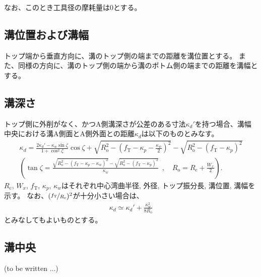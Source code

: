なお、このとき工具径の摩耗量は0とする。


\subsection{溝位置および溝幅}
トップ端から垂直方向に、溝のトップ側の端までの距離を溝位置とする。
また、同様の方向に、溝のトップ側の端から溝のボトム側の端までの距離を溝幅とする。


\subsection{溝深さ}
トップ側に外削がなく、かつA側溝深さが公差のある寸法$\kappa_d'$を持つ場合、溝幅中央における溝A側面とA側外面との距離$\kappa_d$は以下のものとみなす。
\begin{gather*}
  \kappa_d
  = \frac{2\kappa_d'-\kappa_w\sin\zeta}{1+\cos^2\zeta}\cos\zeta
    +\sqrt{R_\mathrm o^2-\left(f_\mathrm T-\kappa_p-\frac{\kappa_w}2\right)^{\!2}}
    -\sqrt{R_\mathrm o^2-\left(f_\mathrm T-\kappa_p\right)^2}\\[3pt]
  \left(
  \tan\zeta
  = \frac{\sqrt{R_\mathrm o^2-\left(f_\mathrm T-\kappa_p-\kappa_w\right)^2}
          -\sqrt{R_\mathrm o^2-\left(f_\mathrm T-\kappa_p\right)^2}}
         {\kappa_w}
    ~~, \quad
    R_\mathrm o = R_\mathrm c+\frac{W_x}2
  \right).
\end{gather*}
$R_\mathrm c$, $W_x$, $f_\mathrm T$, $\kappa_p$, $\kappa_w$はそれぞれ中心湾曲半径, 外径, トップ振分長, 溝位置, 溝幅を示す。
なお、$(\nicefrac{f_\mathrm T}{R_\mathrm c})^2$が十分小さい場合は、
\begin{align*}
  \kappa_d \simeq \kappa_d'+\frac{\kappa_w^2}{8R_\mathrm o}
\end{align*}
とみなしてもよいものとする。


\subsection{溝中央\TBW}
(to be written ...)



